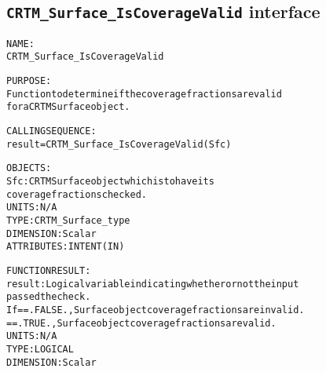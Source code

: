 \subsection{\texttt{CRTM\_Surface\_IsCoverageValid} interface}
  \label{sec:CRTM_Surface_IsCoverageValid_interface}
  \begin{alltt}
 
  NAME:
        CRTM_Surface_IsCoverageValid
 
  PURPOSE:
        Function to determine if the coverage fractions are valid
        for a CRTM Surface object. 
 
  CALLING SEQUENCE:
        result = CRTM_Surface_IsCoverageValid( Sfc )
 
  OBJECTS:
        Sfc:       CRTM Surface object which is to have its
                   coverage fractions checked.
                   UNITS:      N/A
                   TYPE:       CRTM_Surface_type
                   DIMENSION:  Scalar
                   ATTRIBUTES: INTENT(IN)
 
  FUNCTION RESULT:
        result:    Logical variable indicating whether or not the input
                   passed the check.
                   If == .FALSE., Surface object coverage fractions are invalid.
                      == .TRUE.,  Surface object coverage fractions are valid.
                   UNITS:      N/A
                   TYPE:       LOGICAL
                   DIMENSION:  Scalar
 
  \end{alltt}
